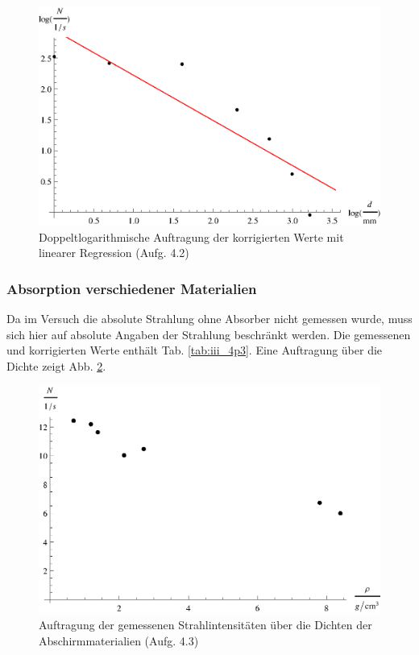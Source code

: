 \begin{table}[p]
\centering
\caption{Korrigierte Zählraten bei verschiedenen Absorberdicken (Aufg. 4.2)}
\label{tab:iii_4p2}

\end{table}

\begin{figure}[p]
\centering
\includegraphics[scale=1.0]{fig/iii_4p2.eps}
\caption{Doppeltlogarithmische Auftragung der korrigierten Werte mit linearer Regression (Aufg. 4.2)}
\label{fig:iii_4p2}
\end{figure}

\subsubsection{Absorption verschiedener Materialien}
Da im Versuch die absolute Strahlung ohne Absorber nicht gemessen wurde, muss sich hier auf absolute Angaben der Strahlung beschränkt werden. Die gemessenen und korrigierten Werte enthält Tab. \ref{tab:iii_4p3}. Eine Auftragung über die Dichte zeigt Abb. \ref{fig:iii_4p3}.

\begin{table}[p]
\centering
\caption{Strahlintensität bei verschiedenen Abschirmmaterialien (Aufg. 4.3)}
\label{tab:iii_4p3}


\end{table}

\begin{figure}[p]
\centering
\includegraphics[scale=1.0]{fig/iii_4p3.eps}
\caption{Auftragung der gemessenen Strahlintensitäten über die Dichten der Abschirmmaterialien (Aufg. 4.3)}
\label{fig:iii_4p3}
\end{figure}